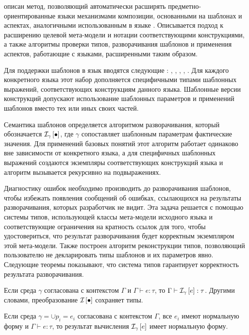 \renewcommand{\thepart}{4}
 описан метод, позволяющий автоматически расширять предметно-ориентированные языки механизмами композиции, основанными на шаблонах и аспектах, аналогичными использованным в языке \GRM{}. Описывается подход к расширению целевой мета-модели и нотации соответствующими конструкциями, а также алгоритмы проверки типов, разворачивания шаблонов и применения аспектов, работающие с языками, расширенными таким образом.

Для поддержки шаблонов в язык вводятся следующие : , , , , . Для каждого конкретного языка этот набор дополняется специфичными типами шаблонных выражений, соответствующих конструкциям данного языка. Шаблонные версии конструкций допускают использование шаблонных параметров и применений шаблонов вместо тех или иных своих частей. 

Семантика шаблонов определяется алгоритмом разворачивания, который обозначается $\mathcal{I}_{\gamma} \left[ \bullet \right]$, где  $\gamma$ сопоставляет шаблонным параметрам фактические значения. Для применений базовых понятий этот алгоритм работает одинаково вне зависимости от конкретного языка, а для специфичных шаблонных выражений создаются экземпляры соответствующих конструкций языка и алгоритм вызывается рекурсивно на подвыражениях.

Диагностику ошибок необходимо производить до разворачивания шаблонов, чтобы избежать появления сообщений об ошибках, ссылающихся на результаты разворачивания, которых разработчик не видит. Эта задача решается с помощью системы типов, использующей классы мета-модели исходного языка и соответствующие ограничения на кратность ссылок для того, чтобы удостовериться, что результат разворачивания будет корректным экземпляром этой мета-модели. 
Также построен алгоритм реконструкции типов, позволяющий пользователю не декларировать типы шаблонов и их параметров явно. Следующие теоремы показывают, что система типов гарантирует корректность результата разворачивания.

\begin{Th}
Если среда $\gamma$ согласована с контекстом $\Gamma$ и $\Gamma \vdash e : \tau$, то $\Gamma \vdash \mathcal{I}_{\gamma} \left[ e \right] : \tau$. Другими словами, преобразование $\mathcal{I}_{} \left[ \bullet \right]$ сохраняет типы.
\end{Th}

\begin{Th}[О нормализации]
Если среда $\gamma = \cup {p_i = e_i}$ согласована с контекстом $\Gamma$, все $e_i$ имеют нормальную форму и $\Gamma \vdash e : \tau$, то результат вычисления $\mathcal{I}_{\gamma} \left[ e \right]$ имеет нормальную форму.
\end{Th}


